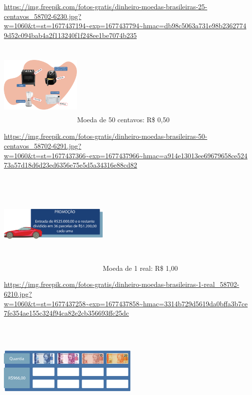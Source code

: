 \begin{escolha}
{\url{https://img.freepik.com/fotos-gratis/dinheiro-moedas-brasileiras-25-centavos_58702-6230.jpg?w=1060\&t=st=1677437194~exp=1677437794~hmac=db98c5063a731e98b23627749d52c094bab4a2f113240f1f248ee1be7074b235}

\includegraphics[width=1.56667in,height=1.61849in]{media/image67.png}Moeda
de 50 centavos: R\$ 0,50

\url{https://img.freepik.com/fotos-gratis/dinheiro-moedas-brasileiras-50-centavos_58702-6291.jpg?w=1060\&t=st=1677437366~exp=1677437966~hmac=a914e13013ee69679658ce52473a57d18d6d23ed6356e75e5d5a34316e88cd82}

\includegraphics[width=2.11667in,height=2.01180in]{media/image68.png}Moeda
de 1 real: R\$ 1,00

\url{https://img.freepik.com/fotos-gratis/dinheiro-moedas-brasileiras-1-real_58702-6210.jpg?w=1060\&t=st=1677437258~exp=1677437858~hmac=3314b729d5619da0bffa3b7ce7fe354ae155c324f94ca82e2cb356693ffc25dc}

\includegraphics[width=2.71068in,height=1.97500in]{media/image69.png}%

}
\end{escolha}
